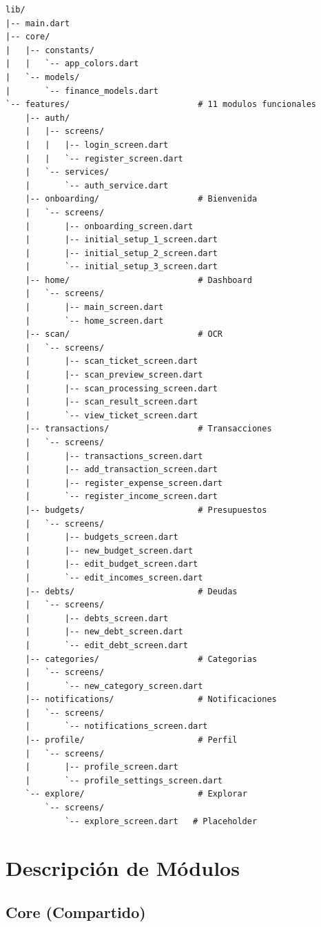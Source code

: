 \begin{lstlisting}[caption={Arbol del proyecto}]
lib/
|-- main.dart
|-- core/
|   |-- constants/
|   |   `-- app_colors.dart
|   `-- models/
|       `-- finance_models.dart
`-- features/                          # 11 modulos funcionales
    |-- auth/
    |   |-- screens/
    |   |   |-- login_screen.dart
    |   |   `-- register_screen.dart
    |   `-- services/
    |       `-- auth_service.dart
    |-- onboarding/                    # Bienvenida
    |   `-- screens/
    |       |-- onboarding_screen.dart
    |       |-- initial_setup_1_screen.dart
    |       |-- initial_setup_2_screen.dart
    |       `-- initial_setup_3_screen.dart
    |-- home/                          # Dashboard
    |   `-- screens/
    |       |-- main_screen.dart
    |       `-- home_screen.dart
    |-- scan/                          # OCR
    |   `-- screens/
    |       |-- scan_ticket_screen.dart
    |       |-- scan_preview_screen.dart
    |       |-- scan_processing_screen.dart
    |       |-- scan_result_screen.dart
    |       `-- view_ticket_screen.dart
    |-- transactions/                  # Transacciones
    |   `-- screens/
    |       |-- transactions_screen.dart
    |       |-- add_transaction_screen.dart
    |       |-- register_expense_screen.dart
    |       `-- register_income_screen.dart
    |-- budgets/                       # Presupuestos
    |   `-- screens/
    |       |-- budgets_screen.dart
    |       |-- new_budget_screen.dart
    |       |-- edit_budget_screen.dart
    |       `-- edit_incomes_screen.dart
    |-- debts/                         # Deudas
    |   `-- screens/
    |       |-- debts_screen.dart
    |       |-- new_debt_screen.dart
    |       `-- edit_debt_screen.dart
    |-- categories/                    # Categorias
    |   `-- screens/
    |       `-- new_category_screen.dart
    |-- notifications/                 # Notificaciones
    |   `-- screens/
    |       `-- notifications_screen.dart
    |-- profile/                       # Perfil
    |   `-- screens/
    |       |-- profile_screen.dart
    |       `-- profile_settings_screen.dart
    `-- explore/                       # Explorar
        `-- screens/
            `-- explore_screen.dart   # Placeholder
\end{lstlisting}

\section{Descripción de Módulos}

\subsection{Core (Compartido)}

